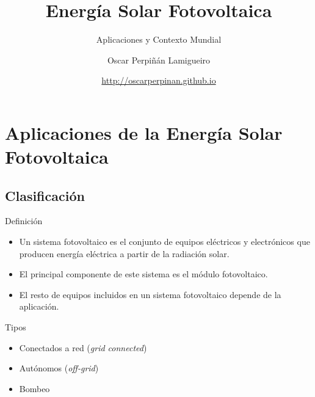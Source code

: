 \documentclass[xcolor={usenames,svgnames,dvipsnames}]{beamer}
\author{Oscar Perpiñán Lamigueiro}
\date{\url{http://oscarperpinan.github.io}}
\title{Energía Solar Fotovoltaica}
\subtitle{Aplicaciones y Contexto Mundial}
\begin{document}
\maketitle

\section{Aplicaciones de la Energía Solar Fotovoltaica}
\label{sec:org05381b2}

\subsection{Clasificación}
\label{sec:org7e41953}

\begin{frame}[label={sec:orgf1463f2}]{Definición}
\begin{itemize}
\item Un sistema fotovoltaico es el conjunto de equipos eléctricos y
electrónicos que producen energía eléctrica a partir de la radiación
solar.

\item El principal componente de este sistema es el módulo fotovoltaico.

\item El resto de equipos incluidos en un sistema fotovoltaico depende de la aplicación.
\end{itemize}

\begin{block}{Tipos}
\begin{itemize}
\item Conectados a red (\emph{grid connected})

\item Autónomos (\emph{off-grid})

\item Bombeo
\end{itemize}
\end{block}
\end{frame}
\end{document}
